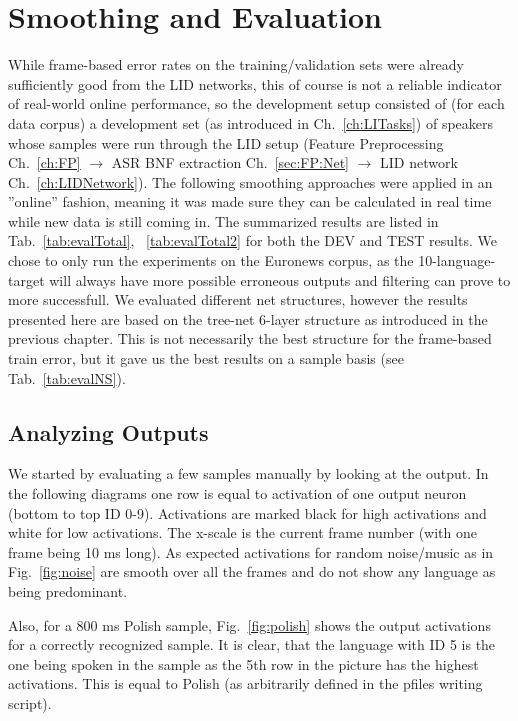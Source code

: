 \chapter{Smoothing and Evaluation}
\label{ch:eval}

While frame-based error rates on the training/validation sets were already sufficiently good from the LID networks, this of course is not a reliable indicator of real-world online performance, so the development setup consisted of (for each data corpus) a development set (as introduced in Ch.~\ref{ch:LITasks}) of speakers whose samples were run through the LID setup (Feature Preprocessing Ch.~\ref{ch:FP} $\rightarrow$ ASR BNF extraction Ch.~\ref{sec:FP:Net} $\rightarrow$ LID network Ch.~\ref{ch:LIDNetwork}). The following smoothing approaches were applied in an ''online'' fashion, meaning it was made sure they can be calculated in real time while new data is still coming in. The summarized results are listed in Tab.~\ref{tab:evalTotal}, ~\ref{tab:evalTotal2} for both the DEV and TEST results. We chose to only run the experiments on the Euronews corpus, as the 10-language-target will always have more possible erroneous outputs and filtering can prove to more successfull. We evaluated different net structures, however the results presented here are based on the tree-net 6-layer structure as introduced in the previous chapter. This is not necessarily the best structure for the frame-based train error, but it gave us the best results on a sample basis (see Tab.~\ref{tab:evalNS}).

\section{Analyzing Outputs}
\label{sec:outputs}

We started by evaluating a few samples manually by looking at the output. In the following diagrams one row is equal to activation of one output neuron (bottom to top ID 0-9). Activations are marked black for high activations and white for low activations. The x-scale is the current frame number (with one frame being 10 ms long). As expected activations for random noise/music as in Fig.~\ref{fig:noise} are smooth over all the frames and do not show any language as being predominant. 

Also, for a 800 ms Polish sample, Fig.~\ref{fig:polish} shows the output activations for a correctly recognized sample. It is clear, that the language with ID 5 is the one being spoken in the sample as the 5th row in the picture has the highest activations. This is equal to Polish (as arbitrarily defined in the pfiles writing script). 

